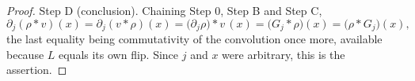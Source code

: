 \begin{proof}
Step D (conclusion).  Chaining Step 0, Step B and Step C,
\[
  \partial_j(\rho * v)(x) = \partial_j(v * \rho)(x)
    = \bigl(\partial_j\rho\bigr) * v \,(x)
    = \bigl(G_j * \rho\bigr)(x)
    = \bigl(\rho * G_j\bigr)(x),
\]
the last equality being commutativity of the convolution once more, available
because $L$ equals its own flip.  Since $j$ and $x$ were arbitrary, this is the
assertion.
\end{proof}
